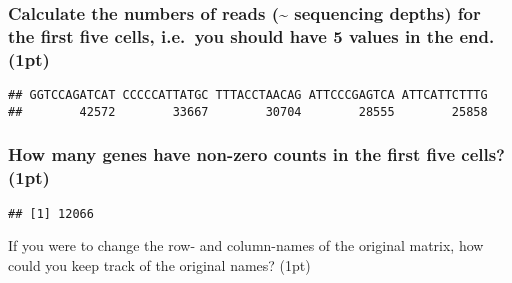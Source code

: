 \documentclass[]{article}
\newenvironment{Shaded}{\begin{snugshade}}{\end{snugshade}}
\newcommand{\KeywordTok}[1]{\textcolor[rgb]{0.13,0.29,0.53}{\textbf{#1}}}
\newcommand{\DecValTok}[1]{\textcolor[rgb]{0.00,0.00,0.81}{#1}}
\newcommand{\StringTok}[1]{\textcolor[rgb]{0.31,0.60,0.02}{#1}}
\newcommand{\OperatorTok}[1]{\textcolor[rgb]{0.81,0.36,0.00}{\textbf{#1}}}
\newcommand{\NormalTok}[1]{#1}
\begin{document}
\subsubsection{Calculate the numbers of reads (\textasciitilde{}
sequencing depths) for the first five cells, i.e.~you should have 5
values in the end.
(1pt)}\label{calculate-the-numbers-of-reads-sequencing-depths-for-the-first-five-cells-i.e.you-should-have-5-values-in-the-end.-1pt}

\begin{Shaded}
\end{Shaded}

\begin{verbatim}
## GGTCCAGATCAT CCCCCATTATGC TTTACCTAACAG ATTCCCGAGTCA ATTCATTCTTTG 
##        42572        33667        30704        28555        25858
\end{verbatim}

\subsubsection{How many genes have non-zero counts in the first five
cells?
(1pt)}\label{how-many-genes-have-non-zero-counts-in-the-first-five-cells-1pt}

\begin{Shaded}
\end{Shaded}

\begin{verbatim}
## [1] 12066
\end{verbatim}

If you were to change the row- and column-names of the original matrix,
how could you keep track of the original names? (1pt)

\begin{Shaded}
\end{Shaded}
\end{document}
